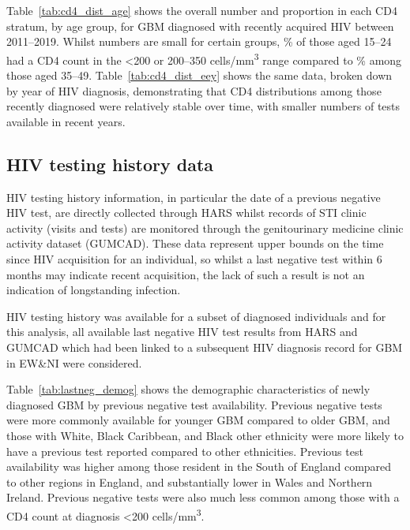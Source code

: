 Table~\ref{tab:cd4_dist_age} shows the overall number and proportion in each CD4 stratum, by age group, for GBM diagnosed with recently acquired HIV between 2011--2019. Whilst numbers are small for certain groups, \% of those aged 15--24 had a CD4 count in the <200 or 200--350 cells/mm\textsuperscript{3} range compared to \% among those aged 35--49. Table~\ref{tab:cd4_dist_eey} shows the same data, broken down by year of HIV diagnosis, demonstrating that CD4 distributions among those recently diagnosed were relatively stable over time, with smaller numbers of tests available in recent years.





\subsection{HIV testing history data}

HIV testing history information, in particular the date of a previous negative HIV test, are directly collected through HARS whilst records of STI clinic activity (visits and tests) are monitored through the genitourinary medicine clinic activity dataset (GUMCAD). These data represent upper bounds on the time since HIV acquisition for an individual, so whilst a last negative test within 6 months may indicate recent acquisition, the lack of such a result is not an indication of longstanding infection.

HIV testing history was available for a subset of diagnosed individuals and for this analysis, all available last negative HIV test results from HARS and GUMCAD which had been linked to a subsequent HIV diagnosis record for GBM in EW\&NI were considered.

Table~\ref{tab:lastneg_demog} shows the demographic characteristics of newly diagnosed GBM by previous negative test availability. Previous negative tests were more commonly available for younger GBM compared to older GBM, and those with White, Black Caribbean, and Black other ethnicity were more likely to have a previous test reported compared to other ethnicities. Previous test availability was higher among those resident in the South of England compared to other regions in England, and substantially lower in Wales and Northern Ireland. Previous negative tests were also much less common among those with a CD4 count at diagnosis <200 cells/mm\textsuperscript{3}.

